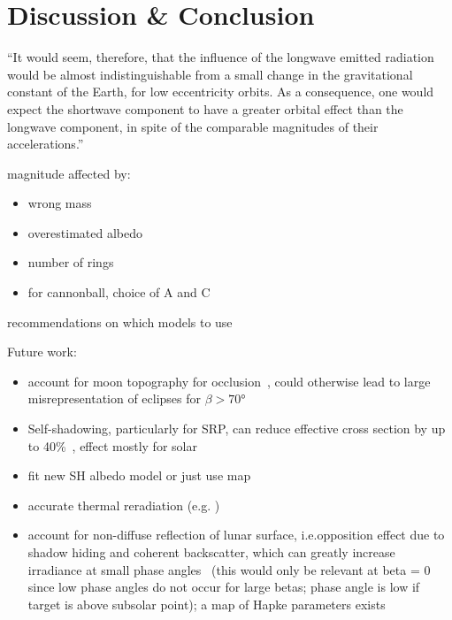 \section{Discussion \& Conclusion}

\enquote{It would seem, therefore,
that the influence of the longwave emitted radiation would be almost
indistinguishable from a small change in the gravitational constant of the Earth, for
low eccentricity orbits.
As a consequence, one would expect the shortwave
component to have a greater orbital effect than the longwave component, in spite of
the comparable magnitudes of their accelerations.}~\cite{Knocke1989}


magnitude affected by:
\begin{itemize}
    \item wrong mass
    \item overestimated albedo
    \item number of rings
    \item for cannonball, choice of A and C
\end{itemize}

recommendations on which models to use


Future work:
\begin{itemize}
    \item account for moon topography for occlusion~\cite{Mazarico2018}, could otherwise lead to large misrepresentation of eclipses for $\beta > \ang{70}$
    \item Self-shadowing, particularly for SRP, can reduce effective cross section by up to 40\%~\cite{Mazarico2018}, effect mostly for solar~\cite{Mazarico2009}
    \item fit new SH albedo model or just use map
    \item accurate thermal reradiation (e.g. \cite{Marshall1994})
    \item account for non-diffuse reflection of lunar surface, i.e.opposition effect due to shadow hiding and coherent backscatter, which can greatly increase irradiance at small phase angles~\cite{Buratti1996} (this would only be relevant at beta = 0 since low phase angles do not occur for large betas; phase angle is low if target is above subsolar point); a map of Hapke parameters exists~\cite{Sato2014}
\end{itemize}


